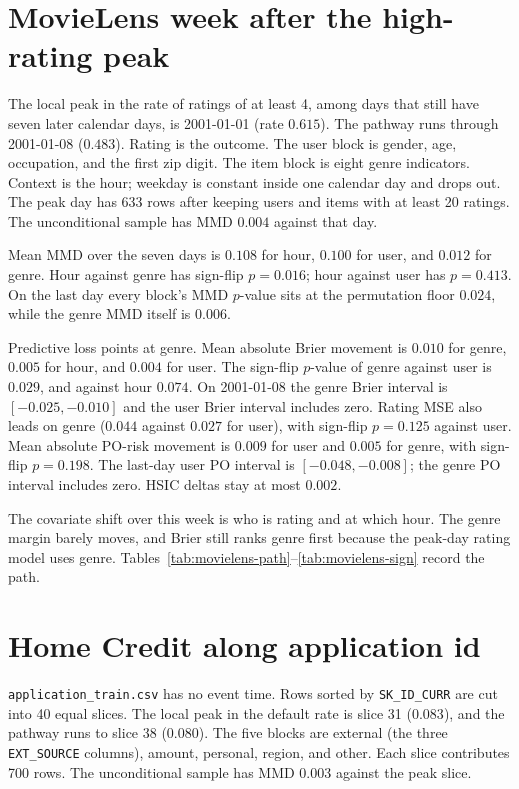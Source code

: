 \documentclass[11pt]{article}
\begin{document}
\section{MovieLens week after the high-rating peak}

The local peak in the rate of ratings of at least 4, among days that still
have seven later calendar days, is 2001-01-01 (rate \(0.615\)). The pathway
runs through 2001-01-08 (\(0.483\)). Rating is the outcome. The user block
is gender, age, occupation, and the first zip digit. The item block is
eight genre indicators. Context is the hour; weekday is constant inside one
calendar day and drops out. The peak day has 633 rows after keeping users
and items with at least 20 ratings. The unconditional sample has MMD
\(0.004\) against that day.

Mean MMD over the seven days is \(0.108\) for hour, \(0.100\) for user, and
\(0.012\) for genre. Hour against genre has sign-flip \(p=0.016\); hour
against user has \(p=0.413\). On the last day every block's MMD \(p\)-value
sits at the permutation floor \(0.024\), while the genre MMD itself is
\(0.006\).

Predictive loss points at genre. Mean absolute Brier movement is \(0.010\)
for genre, \(0.005\) for hour, and \(0.004\) for user. The sign-flip
\(p\)-value of genre against user is \(0.029\), and against hour \(0.074\).
On 2001-01-08 the genre Brier interval is \([-0.025,-0.010]\) and the user
Brier interval includes zero. Rating MSE also leads on genre (\(0.044\)
against \(0.027\) for user), with sign-flip \(p=0.125\) against user.
Mean absolute PO-risk movement is \(0.009\) for user and \(0.005\) for
genre, with sign-flip \(p=0.198\). The last-day user PO interval is
\([-0.048,-0.008]\); the genre PO interval includes zero. HSIC deltas stay
at most \(0.002\).

The covariate shift over this week is who is rating and at which hour.
The genre margin barely moves, and Brier still ranks genre first because
the peak-day rating model uses genre.
Tables~\ref{tab:movielens-path}--\ref{tab:movielens-sign} record the path.

\section{Home Credit along application id}

\texttt{application\_train.csv} has no event time. Rows sorted by
\texttt{SK\_ID\_CURR} are cut into 40 equal slices. The local peak in the
default rate is slice 31 (\(0.083\)), and the pathway runs to slice 38
(\(0.080\)). The five blocks are external (the three \texttt{EXT\_SOURCE} columns),
amount, personal, region, and other. Each slice contributes 700 rows. The
unconditional sample has MMD \(0.003\) against the peak slice.
\end{document}
